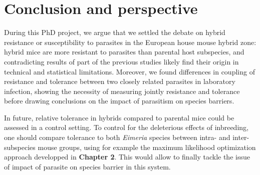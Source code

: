 \section{Conclusion and perspective}

During this PhD project, we argue that we settled the debate on hybrid resistance or susceptibility to parasites in the European house mouse hybrid zone: hybrid mice are more resistant to parasites than parental host subspecies, and contradicting results of part of the previous studies likely find their origin in technical and statistical limitations. Moreover, we found differences in coupling of resistance and tolerance between two closely related parasites in laboratory infection, showing the necessity of measuring jointly resistance and tolerance before drawing conclusions on the impact of parasitism on species barriers. \par

In future, relative tolerance in hybrids compared to parental mice could be assessed in a control setting. To control for the deleterious effects of inbreeding, one should compare tolerance to both \textit{Eimeria} species between intra- and inter-subspecies mouse groups, using for example the maximum likelihood optimization approach developped in \textbf{Chapter 2}. This would allow to finally tackle the issue of impact of parasite on species barrier in this system.


